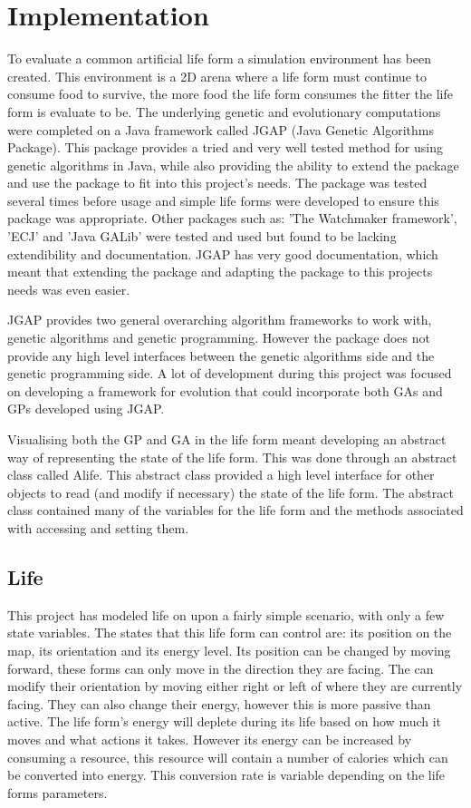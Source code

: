 \documentclass[12pt]{article}
\begin{document}
\section{Implementation}
To evaluate a common artificial life form a simulation environment has been created.
This environment is a 2D arena where a life form must continue to consume food to survive, the more food the life form consumes the fitter the  
life form is evaluate to be.
The underlying genetic and evolutionary computations were completed on a Java framework called JGAP (Java Genetic Algorithms Package).
This package provides a tried and very well tested method for using genetic algorithms in Java, while also providing the 
ability to extend the package and use the package to fit into this project's needs. The package was tested several times before usage
and simple life forms were developed to ensure this package was appropriate. Other packages such as: 'The Watchmaker framework', 'ECJ' and 'Java GALib'
were tested and used but found to be lacking extendibility and documentation. JGAP has very good documentation, which meant that extending
the package and adapting the package to this projects needs was even easier.

JGAP provides two general overarching algorithm frameworks to work with, genetic algorithms and genetic programming. However
the package does not provide any high level interfaces between the genetic algorithms side and the genetic programming side. A 
lot of development during this project was focused on developing a framework for evolution that could incorporate both GAs and GPs developed
using JGAP. 

Visualising both the GP and GA in the life form meant developing an abstract way of representing the state of the life form. This was done
through an abstract class called Alife. This abstract class provided a high level interface for other objects to read (and modify if necessary)
the state of the life form. The abstract class contained many of the variables for the life form and the methods associated with accessing and
setting them.

\subsection{Life}

This project has modeled life on upon a fairly simple scenario, with only a few state variables. The states that this life form
can control are: its position on the map, its orientation and its energy level. Its position can be changed by moving forward, these 
forms can only move in the direction they are facing. The can modify their orientation by moving either right or left of where they 
are currently facing. They can also change their energy, however this is more passive than active. The life form's energy will
deplete during its life based on how much it moves and what actions it takes. However its energy can be increased by consuming a 
resource, this resource will contain a number of calories which can be converted into energy. This conversion rate is variable
depending on the life forms parameters. 
\end{document}
